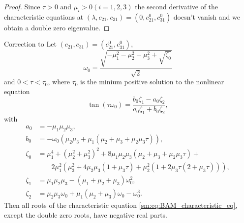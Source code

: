 \begin{proof}
Since $\tau>0$ and $\mu_{i}>0(i=1,2,3)$ the second derivative of
the characteristic equations at $(\lambda,c_{21},c_{31})=(0,c_{21}^{0},c_{31}^{0})$
doesn't vanish and we obtain a double zero eigenvalue.
\end{proof}

\begin{lemma}
\label{sm:lemma:triNeuralBAMNetworkModelEigenvalues}
\textup{Correction to \cite[Lemma 3]{dong2013bogdanov}}
Let $(c_{21},c_{31})=(c_{21}^{0},c_{31}^{0})$,
\begin{equation}
    \label{sm:eq:triNeuralBAMNetworkModel:omega_0} 
    \omega_0 = \frac{\sqrt{-\mu_1^2 - \mu_2^2 - \mu_3^2 + \sqrt{\zeta_0}}}{\sqrt{2}}
\end{equation}
and $0<\tau<\tau_{0}$, where $\tau_0$ is the minium positive solution to the nonlinear equation
\begin{equation}
    \label{sm:eq:triNeuralBAMNetworkModel:tan} 
    \tan (\tau \omega_0) = \frac{b_0\zeta_1 - a_0\zeta_2}{a_0\zeta_1 + b_0\zeta_2},
\end{equation}
with
\begin{align*}
a_0 &= -\mu_1\mu_2\mu_3, \\ 
b_0 &= -\omega_0(\mu_2\mu_3 + \mu_1(\mu_2 + \mu_3 + \mu_2\mu_3\tau)), \\
\zeta_0 &= \mu_1^4 + (\mu_2^2 + \mu_3^2)^2 + 8\mu_1\mu_2\mu_3(\mu_2 + \mu_3 + \mu_2\mu_3\tau) + \\
        &\qquad 2\mu_1^2(\mu_3^2 + 4\mu_2\mu_3(1 + \mu_3\tau) + \mu_2^2(1 + 2\mu_3\tau(2 + \mu_3\tau))), \\
\zeta_1 &= \mu_1\mu_2\mu_3 - (\mu_1 + \mu_2 + \mu_3)\omega_0^2, \\
\zeta_2 &= \mu_2\mu_3\omega_0 + \mu_1(\mu_2 + \mu_3)\omega_0 - \omega_0^3.
\end{align*}
Then all roots of the characteristic equation \cref{sm:eq:BAM_characteristic_eq},
except the double zero roots, have negative real parts.
\end{lemma}

